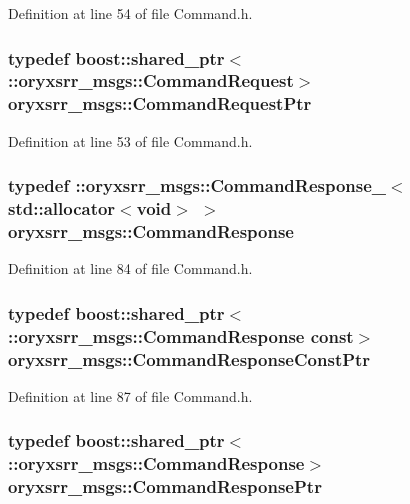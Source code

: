 \-Definition at line 54 of file \-Command.\-h.

\subsubsection[{\-Command\-Request\-Ptr}]{\setlength{\rightskip}{0pt plus 5cm}typedef boost\-::shared\-\_\-ptr$<$ \-::{\bf oryxsrr\-\_\-msgs\-::\-Command\-Request}$>$ {\bf oryxsrr\-\_\-msgs\-::\-Command\-Request\-Ptr}}\label{namespaceoryxsrr__msgs_a3ea62e7f2c948cfd5dfb17c0f5e7dbaa}


\-Definition at line 53 of file \-Command.\-h.

\subsubsection[{\-Command\-Response}]{\setlength{\rightskip}{0pt plus 5cm}typedef \-::{\bf oryxsrr\-\_\-msgs\-::\-Command\-Response\-\_\-}$<$std\-::allocator$<$void$>$ $>$ {\bf oryxsrr\-\_\-msgs\-::\-Command\-Response}}\label{namespaceoryxsrr__msgs_ab17dfee9fae4803f45c29a4c17f2db64}


\-Definition at line 84 of file \-Command.\-h.

\subsubsection[{\-Command\-Response\-Const\-Ptr}]{\setlength{\rightskip}{0pt plus 5cm}typedef boost\-::shared\-\_\-ptr$<$ \-::{\bf oryxsrr\-\_\-msgs\-::\-Command\-Response} const$>$ {\bf oryxsrr\-\_\-msgs\-::\-Command\-Response\-Const\-Ptr}}\label{namespaceoryxsrr__msgs_ad75cc40539259b7fa4ac833842be87a6}


\-Definition at line 87 of file \-Command.\-h.

\subsubsection[{\-Command\-Response\-Ptr}]{\setlength{\rightskip}{0pt plus 5cm}typedef boost\-::shared\-\_\-ptr$<$ \-::{\bf oryxsrr\-\_\-msgs\-::\-Command\-Response}$>$ {\bf oryxsrr\-\_\-msgs\-::\-Command\-Response\-Ptr}}\label{namespaceoryxsrr__msgs_a6f64134e9f56f8e6fb9259544d92954e}


